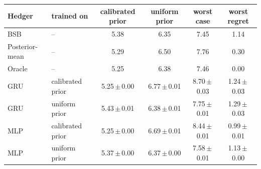 \begin{tabular}{@{}llcccc@{}}
\toprule
Hedger & trained on & calibrated prior & uniform prior & worst case & worst regret \\
\midrule
BSB & -- & 5.38 & 6.35 & 7.45 & 1.14 \\
Posterior-mean & -- & 5.29 & 6.50 & 7.76 & 0.30 \\
Oracle & -- & 5.25 & 6.38 & 7.46 & 0.00 \\
GRU & calibrated prior & 5.25\,$\pm$\,0.00 & 6.77\,$\pm$\,0.01 & 8.70\,$\pm$\,0.03 & 1.24\,$\pm$\,0.03 \\
GRU & uniform prior & 5.43\,$\pm$\,0.01 & 6.38\,$\pm$\,0.01 & 7.75\,$\pm$\,0.01 & 1.29\,$\pm$\,0.03 \\
MLP & calibrated prior & 5.25\,$\pm$\,0.00 & 6.69\,$\pm$\,0.01 & 8.44\,$\pm$\,0.01 & 0.99\,$\pm$\,0.01 \\
MLP & uniform prior & 5.37\,$\pm$\,0.00 & 6.37\,$\pm$\,0.00 & 7.58\,$\pm$\,0.01 & 1.13\,$\pm$\,0.00 \\
\bottomrule
\end{tabular}

